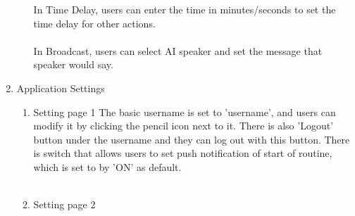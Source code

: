 \begin{enumerate}[label=\arabic*.]
\begin{enumerate}[label*={\arabic*.},ref=\theenumi.\arabic*]
                    \newpage
                    In Time Delay, users can enter the time in minutes/seconds to set the time delay for other actions.\\
                    \\
                    In Broadcast, users can select AI speaker and set the message that speaker would say.\\
          \end{enumerate}
    \clearpage
    \item {\large{Application Settings}}\\
          \begin{enumerate}[label*={\arabic*.},ref=\theenumi.\arabic*]
              \setlength{\itemindent}{0.5cm}
              \item Setting page 1
                    The basic username is set to 'username', and users can modify it by clicking the pencil icon next to it. There is also 'Logout' button under the username and they can log out with this button. There is switch that allows users to set push notification of start of routine, which is set to by 'ON' as default.\\\\
                    \newpage
                      \setlength{\itemindent}{0.5cm}
                      \item Setting page 2
                          \requirementTable{
}
\end{enumerate}
\end{enumerate}
